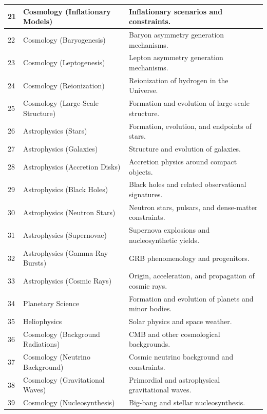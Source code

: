 \documentclass[13pt,a4paper]{article}
\begin{document}
\begin{longtable}{|p{0.9cm}|p{6.0cm}|p{8.6cm}|}
		\hline
		21 & Cosmology (Inflationary Models) & Inflationary scenarios and constraints. \\
		\hline
		22 & Cosmology (Baryogenesis) & Baryon asymmetry generation mechanisms. \\
		\hline
		23 & Cosmology (Leptogenesis) & Lepton asymmetry generation mechanisms. \\
		\hline
		24 & Cosmology (Reionization) & Reionization of hydrogen in the Universe. \\
		\hline
		25 & Cosmology (Large-Scale Structure) & Formation and evolution of large-scale structure. \\
		\hline
		26 & Astrophysics (Stars) & Formation, evolution, and endpoints of stars. \\
		\hline
		27 & Astrophysics (Galaxies) & Structure and evolution of galaxies. \\
		\hline
		28 & Astrophysics (Accretion Disks) & Accretion physics around compact objects. \\
		\hline
		29 & Astrophysics (Black Holes) & Black holes and related observational signatures. \\
		\hline
		30 & Astrophysics (Neutron Stars) & Neutron stars, pulsars, and dense-matter constraints. \\
		\hline
		31 & Astrophysics (Supernovae) & Supernova explosions and nucleosynthetic yields. \\
		\hline
		32 & Astrophysics (Gamma-Ray Bursts) & GRB phenomenology and progenitors. \\
		\hline
		33 & Astrophysics (Cosmic Rays) & Origin, acceleration, and propagation of cosmic rays. \\
		\hline
		34 & Planetary Science & Formation and evolution of planets and minor bodies. \\
		\hline
		35 & Heliophysics & Solar physics and space weather. \\
		\hline
		36 & Cosmology (Background Radiations) & CMB and other cosmological backgrounds. \\
		\hline
		37 & Cosmology (Neutrino Background) & Cosmic neutrino background and constraints. \\
		\hline
		38 & Cosmology (Gravitational Waves) & Primordial and astrophysical gravitational waves. \\
		\hline
		39 & Cosmology (Nucleosynthesis) & Big-bang and stellar nucleosynthesis. \\
		\hline
	\end{longtable}
	
\end{document}
